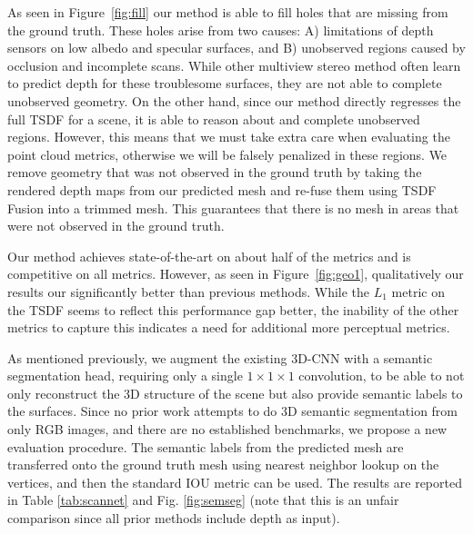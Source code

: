 \documentclass[runningheads]{llncs}
\begin{document}
As seen in Figure~\ref{fig:fill} our method is able to fill holes that are missing from the ground truth.
These holes arise from two causes: A) limitations of depth sensors on low albedo and specular surfaces, and B) unobserved regions caused by occlusion and incomplete scans. While other multiview stereo method often learn to predict depth for these troublesome surfaces, they are not able to complete unobserved geometry. On the other hand, since our method directly regresses the full TSDF for a scene, it is able to reason about and complete unobserved regions. However, this means that we must take extra care when evaluating the point cloud metrics, otherwise we will be falsely penalized in these regions. We remove geometry that was not observed in the ground truth by taking the rendered depth maps from our predicted mesh and re-fuse them using TSDF Fusion into a trimmed mesh. This guarantees that there is no mesh in areas that were not observed in the ground truth.



Our method achieves state-of-the-art on about half of the metrics and is competitive on all metrics. However, as seen in Figure~\ref{fig:geo1}, qualitatively our results our significantly better than previous methods. While the $L_1$ metric on the TSDF seems to reflect this performance gap better, the inability of the other metrics to capture this indicates a need for additional more perceptual metrics.


As mentioned previously, we augment the existing 3D-CNN with a semantic segmentation head, requiring only a single $1\times1\times1$ convolution, to be able to not only reconstruct the 3D structure of the scene but also provide semantic labels to the surfaces. Since no prior work attempts to do 3D semantic segmentation from only RGB images, and there are no established benchmarks, we propose a new evaluation procedure. The semantic labels from the predicted mesh are transferred onto the ground truth mesh using nearest neighbor lookup on the vertices, and then the standard IOU metric can be used. The results are reported in Table \ref{tab:scannet} and Fig. \ref{fig:semseg} (note that this is an unfair comparison since all prior methods include depth as input).
\end{document}
